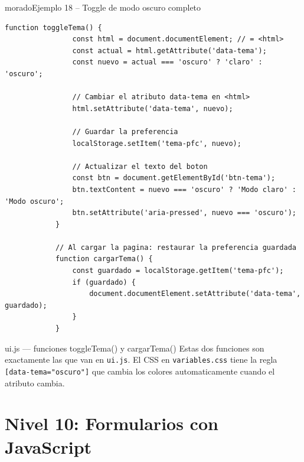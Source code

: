 \documentclass[11pt,a4paper]{article}
\begin{document}
	\begin{cajacodigo}{morado}{Ejemplo 18 -- Toggle de modo oscuro completo}
		\begin{lstlisting}[style=codejs]
			function toggleTema() {
				const html = document.documentElement; // = <html>
				const actual = html.getAttribute('data-tema');
				const nuevo = actual === 'oscuro' ? 'claro' : 'oscuro';
				
				// Cambiar el atributo data-tema en <html>
				html.setAttribute('data-tema', nuevo);
				
				// Guardar la preferencia
				localStorage.setItem('tema-pfc', nuevo);
				
				// Actualizar el texto del boton
				const btn = document.getElementById('btn-tema');
				btn.textContent = nuevo === 'oscuro' ? 'Modo claro' : 'Modo oscuro';
				btn.setAttribute('aria-pressed', nuevo === 'oscuro');
			}
			
			// Al cargar la pagina: restaurar la preferencia guardada
			function cargarTema() {
				const guardado = localStorage.getItem('tema-pfc');
				if (guardado) {
					document.documentElement.setAttribute('data-tema', guardado);
				}
			}
		\end{lstlisting}
	\end{cajacodigo}
	
	\begin{cajapractica}{ui.js --- funciones toggleTema() y cargarTema()}
		Estas dos funciones son exactamente las que van en \texttt{ui.js}. El CSS en \texttt{variables.css} tiene la regla \texttt{[data-tema="oscuro"]} que cambia los colores automaticamente cuando el atributo cambia.
	\end{cajapractica}
	
	\section{Nivel 10: Formularios con JavaScript}
	
\end{document}
